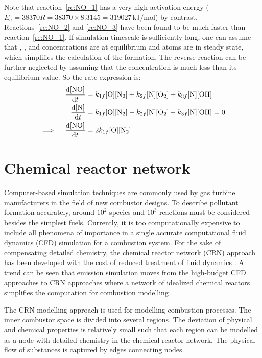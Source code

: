 Note that reaction~\eqref{re:NO_1} has a very high activation energy ($E_a = 38370 R = 38370 \times 8.3145 = 319027 \, \mathrm{kJ/mol}$) by contrast. Reactions~\eqref{re:NO_2} and \eqref{re:NO_3} have been found to be much faster than reaction~\eqref{re:NO_1}. If simulation timescale is sufficiently long, one can assume that , ,  and  concentrations are at equilibrium and  atoms are in steady state, which simplifies the calculation of the  formation. The reverse reaction can be further neglected by assuming that the  concentration is much less than its equilibrium value. So the rate expression is:
\begin{subequations}
\begin{align}
    \frac{\mathrm d [\ce{NO}]}{\mathrm d t} &= k_{1f} [\ce{O}] [\ce{N2}] + k_{2f} [\ce{N}] [\ce{O2}] + k_{3f} [\ce{N}] [\ce{OH}] \\
    \frac{\mathrm d [\ce{N}]}{\mathrm d t} &= k_{1f} [\ce{O}] [\ce{N2}] - k_{2f} [\ce{N}] [\ce{O2}] - k_{3f} [\ce{N}] [\ce{OH}] = 0 \\
    \implies \quad \frac{\mathrm d [\ce{NO}]}{\mathrm d t} &= 2 k_{1f} [\ce{O}] [\ce{N2}]
\end{align}
\end{subequations}

\section{Chemical reactor network} \label{sec:CRN}

Computer-based simulation techniques are commonly used by gas turbine manufacturers in the field of new combustor designs. To describe pollutant formation accurately, around $10^2$ species and $10^3$ reactions must be considered besides the simplest fuels. Currently, it is too computationally expensive to include all phenomena of importance in a single accurate computational fluid dynamics (CFD) simulation for a combustion system. For the sake of compensating detailed chemistry, the chemical reactor network (CRN) approach has been developed with the cost of reduced treatment of fluid dynamics \parencite{CRN}. A trend can be seen that emission simulation moves from the high-budget CFD approaches to CRN approaches where a network of idealized chemical reactors simplifies the computation for combustion modelling \parencite{CRN_review}.

The CRN modelling approach is used for modelling combustion processes. The inner combustor space is divided into several regions. The deviation of physical and chemical properties is relatively small such that each region can be modelled as a node with detailed chemistry in the chemical reactor network. The physical flow of substances is captured by edges connecting nodes.